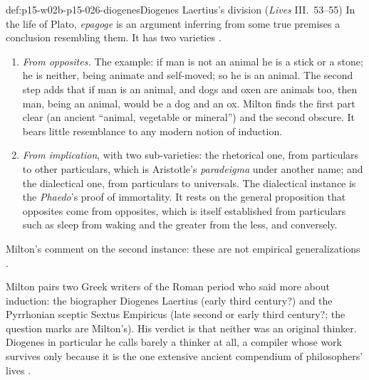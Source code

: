 \begin{hbdefinition}{def:p15-w02b-p15-026-diogenes}{Diogenes Laertius's division (\emph{Lives} III.~53--55)}
In the life of Plato, \emph{epagoge} is an argument inferring from some
true premises a conclusion resembling them. It has two varieties
\cite[pp.~8--9]{Milton2011InductionBeforeHume}.
\begin{enumerate}
\item \emph{From opposites.} The example: if man is not an animal he is a
  stick or a stone; he is neither, being animate and self-moved; so he is
  an animal. The second step adds that if man is an animal, and dogs and oxen are
  animals too, then man, being an animal, would be a dog and an ox. Milton finds the first part clear
  (an ancient ``animal, vegetable or mineral'') and the second obscure. It
  bears little resemblance to any modern notion of induction.
\item \emph{From implication}, with two sub-varieties: the rhetorical one,
  from particulars to other particulars, which is Aristotle's
  \emph{paradeigma} under another name; and the dialectical one, from
  particulars to universals. The dialectical instance is the
  \emph{Phaedo}'s proof of immortality. It rests on the general
  proposition that opposites come from opposites, which is itself
  established from particulars such as sleep from waking and the greater
  from the less, and conversely.
\end{enumerate}
Milton's comment on the second instance: these are not empirical
generalizations \cite[p.~9]{Milton2011InductionBeforeHume}.
\end{hbdefinition}

Milton pairs two Greek writers of the Roman period who said more about
induction: the biographer Diogenes Laertius (early third century?) and the
Pyrrhonian sceptic Sextus Empiricus (late second or early third century?;
the question marks are Milton's). His verdict is that neither was an
original thinker. Diogenes in particular he calls barely a thinker at all,
a compiler whose work survives only because it is the one extensive ancient
compendium of philosophers' lives \cite[p.~8]{Milton2011InductionBeforeHume}.

